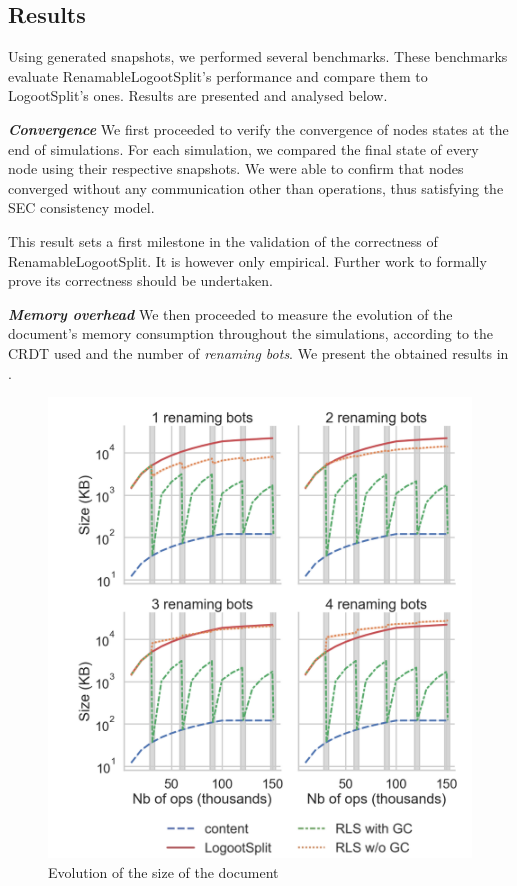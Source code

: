 \documentclass[10pt,journal,compsoc]{IEEEtran}
\let\MYoriglatexcaption\caption
\renewcommand{\caption}[2][\relax]{\MYoriglatexcaption[#2]{#2}}
\newcommand{\headerparagraph}[1]{\textbf{\emph{#1}}\quad}
\begin{document}
\subsection{Results}

Using generated snapshots, we performed several benchmarks.
These benchmarks evaluate RenamableLogootSplit's performance and compare them to LogootSplit's ones.
Results are presented and analysed below.

\headerparagraph{Convergence}
%
We first proceeded to verify the convergence of nodes states at the end of simulations.
For each simulation, we compared the final state of every node using their respective snapshots.
We were able to confirm that nodes converged without any communication other than operations, thus satisfying the \ac{SEC} consistency model.

This result sets a first milestone in the validation of the correctness of RenamableLogootSplit.
It is however only empirical.
Further work to formally prove its correctness should be undertaken.

\headerparagraph{Memory overhead}
%
We then proceeded to measure the evolution of the document's memory consumption throughout the simulations, according to the CRDT used and the number of \emph{renaming bots}.
We present the obtained results in .

\begin{figure}[!ht]
    \centering
    \includegraphics[width=\columnwidth]{img/snapshot-sizes-alt-legende-v2.png}
    \caption{Evolution of the size of the document}
    \label{fig:evolution-document-size}
\end{figure}
\end{document}
